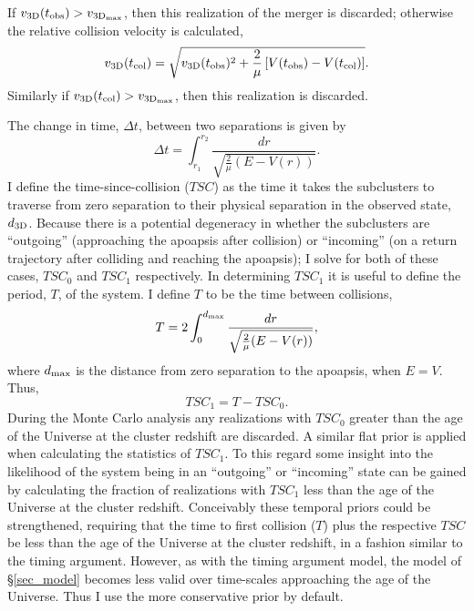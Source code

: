 \documentclass[12pt]{emulateapj}
\begin{document}
If $v_{\rm 3D}(t_{\rm obs}) > v_{\rm 3D_{max}}$, then this realization of the merger is discarded; otherwise the relative collision velocity is calculated,
\begin{displaymath}
v_{\rm 3D}(t_{\rm col}) = \sqrt{v_{\rm 3D}(t_{\rm obs})^2+\frac{2}{\mu}\left[V(t_{\rm obs})-V(t_{\rm col})\right]}.
\end{displaymath}
Similarly if $v_{\rm 3D}(t_{\rm col}) >v_{\rm 3D_{max}}$, then this realization is discarded.

The change in time, $\Delta t$, between two separations is given by
\begin{displaymath}
\Delta t = \int_{r_1}^{r_2} \frac{dr}{\sqrt{\frac{2}{\mu}(E-V(r))}}.
\end{displaymath}
I define the time-since-collision ($TSC$) as the time it takes the subclusters to traverse from zero separation to their physical separation in the observed state, $d_{\rm 3D}$. 
Because there is a potential degeneracy in whether the subclusters are ``outgoing'' (approaching the apoapsis after collision)  or ``incoming'' (on a return trajectory after colliding and reaching the apoapsis); I solve for both of these cases, $TSC_0$ and $TSC_1$ respectively.
In determining $TSC_1$ it is useful to define the period, $T$, of the system.  I define $T$ to be the time between collisions,
\begin{displaymath}
T  = 2 \int_{0}^{d_{\rm max}} \frac{dr}{\sqrt{\frac{2}{\mu}(E-V(r))}},
\end{displaymath}
where $d_{\rm max}$ is the distance from zero separation to the apoapsis, when $E=V$.
Thus,
\begin{displaymath}
TSC_1 = T - TSC_0.
\end{displaymath}
During the Monte Carlo analysis any realizations with $TSC_0$ greater than the age of the Universe at the cluster redshift are discarded.
A similar flat prior is applied when calculating the statistics of $TSC_1$.
To this regard some insight into the likelihood of the system being in an ``outgoing'' or ``incoming'' state can be gained by calculating the fraction of realizations with $TSC_1$ less than the age of the Universe at the cluster redshift.
Conceivably these temporal priors could be strengthened, requiring that the time to first collision ($T$) plus the respective $TSC$ be less than the age of the Universe at the cluster redshift, in a fashion similar to the timing argument.
However, as with the timing argument model, the model of \S\ref{sec_model} becomes less valid over time-scales approaching the age of the Universe.
Thus I use the more conservative prior by default.
\end{document}
